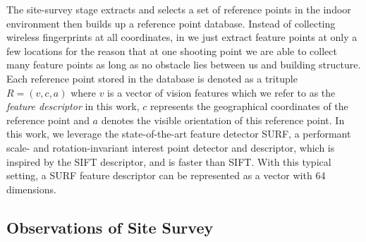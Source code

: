 
The site-survey stage extracts and selects a set of reference points in the indoor environment then builds up a reference point database. Instead of collecting wireless fingerprints at all coordinates, in \oursystem we just extract feature points at only a few locations for the reason that at one shooting point we are able to collect many feature points as long as no obstacle lies between us and building structure. Each reference point stored in the database is denoted as a trituple $R = (v, c, a)$ where $v$ is a vector of vision features which we refer to as the \emph{feature descriptor} in this work, $c$ represents the geographical coordinates of the reference point and $a$ denotes the visible orientation of this reference point.
In this work, we leverage the state-of-the-art feature detector SURF\cite{bay2006surf}, a performant scale- and rotation-invariant interest point detector and descriptor, which is inspired by the SIFT descriptor\cite{lowe2004distinctive}, and is faster than SIFT. With this typical setting, a SURF feature descriptor can be represented as a vector with 64 dimensions.
\subsection{Observations of Site Survey}

